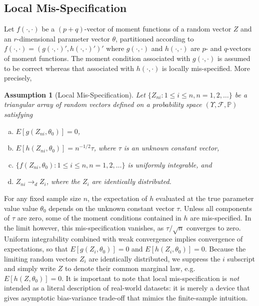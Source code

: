 \documentclass[12pt]{article}
\newtheorem{assump}{Assumption}[section]
\theoremstyle{definition}
\begin{document}
\subsection{Local Mis-Specification}
Let $f(\cdot,\cdot)$ be a $(p+q)$-vector of moment functions of a random vector $Z$ and an $r$-dimensional parameter vector $\theta$, partitioned according to $f(\cdot,\cdot) = \left(g(\cdot,\cdot)', h(\cdot,\cdot)'  \right)'$ where $g(\cdot,\cdot)$ and $h(\cdot,\cdot)$ are $p$- and $q$-vectors of moment functions. 
The moment condition associated with $g(\cdot,\cdot)$ is assumed to be correct whereas that associated with $h(\cdot,\cdot)$ is locally mis-specified.
More precisely, 
\begin{assump}[Local Mis-Specification]
\label{assump:drift}
Let $\{Z_{ni}\colon 1\leq i \leq n, n =1, 2, \hdots\}$ be a triangular array of random vectors defined on a probability space $(\Upsilon, \mathcal{F}, \mathbb{P})$ satisfying
	\begin{enumerate}[(a)]
		\item $E[g(Z_{ni},\theta_0)] = 0$,
		\item $E[h(Z_{ni},\theta_0)] = n^{-1/2}\tau$, where $\tau$ is an unknown constant vector, 
		\item $\{f(Z_{ni},\theta_0)\colon 1\leq i \leq n, n = 1, 2, \hdots\}$ is uniformly integrable, and
		\item $Z_{ni} \rightarrow_dZ_i$, where the $Z_i$ are identically distributed.
	\end{enumerate}
\end{assump}
For any fixed sample size $n$, the expectation of $h$ evaluated at the true parameter value value $\theta_0$ depends on the unknown constant vector $\tau$. 
Unless all components of $\tau$ are zero, some of the moment conditions contained in $h$ are mis-specified. In the limit however, this mis-specification vanishes, as $\tau/\sqrt{n}$ converges to zero. 
Uniform integrability combined with weak convergence implies convergence of expectations, so that $E[g(Z_i, \theta_0)]=0$ and $E[h(Z_i, \theta_0)]=0$. Because the limiting random vectors $Z_i$ are identically distributed, we suppress the $i$ subscript and simply write $Z$ to denote their common marginal law, e.g.\ $E[h(Z,\theta_0)]=0$. 
It is important to note that local mis-specification is \emph{not} intended as a literal description of real-world datasets: it is merely a device that gives asymptotic bias-variance trade-off that mimics the finite-sample intuition. 
\end{document}

